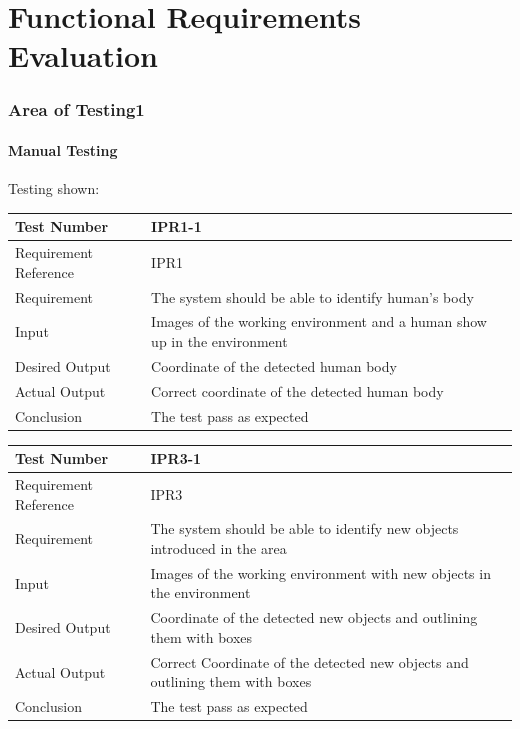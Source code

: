 \documentclass[12pt, titlepage]{article}
\begin{document}
\section{Functional Requirements Evaluation}

\subsubsection{Area of Testing1}
		
\paragraph{Manual Testing}{Testing shown:}
\begin{table}[H]
\begin{center}
\begin{tabular}{|l | m{9cm}|}
\hline
  Test Number & IPR1-1\\
  \hline
  Requirement Reference & IPR1\\
  \hline
  Requirement &  The system should be able to identify human’s body\\
  \hline
  Input & Images of the working environment and a human show up in
the environment\\
  \hline
  Desired Output & Coordinate of the detected human body\\
  \hline
  Actual Output & Correct coordinate of the detected human body\\
  \hline
  Conclusion & The test pass as expected\\
  \hline
\end{tabular}
\end{center}           
\end{table}


\begin{table}[H]
\begin{center}
\begin{tabular}{|l | m{9cm}|}
\hline
  Test Number & IPR3-1\\
  \hline
  Requirement Reference & IPR3\\
  \hline
  Requirement &  The system should be able to identify new objects introduced in the area\\
  \hline
  Input & Images of the working environment with new objects in the environment\\
  \hline
  Desired Output & Coordinate of the detected new objects and outlining them with boxes\\
  \hline
  Actual Output & Correct Coordinate of the detected new objects and outlining them with boxes\\
  \hline
  Conclusion & The test pass as expected\\
  \hline
\end{tabular}
\end{center}           
\end{table}
\end{document}
